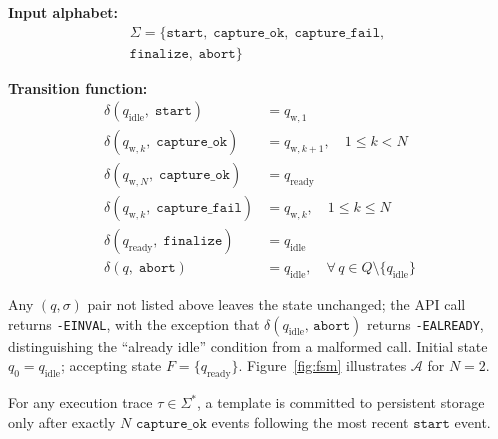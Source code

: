 \noindent\textbf{Input alphabet:}
\begin{multline}
  \Sigma = \{\mathtt{start},\;
             \mathtt{capture\_ok},\;
             \mathtt{capture\_fail},\; \\
             \mathtt{finalize},\;
             \mathtt{abort}\}
  \label{eq:alphabet}
\end{multline}

\noindent\textbf{Transition function:}
\begin{align}
  \delta(q_{\mathrm{idle}},\; \mathtt{start})
    &= q_{\mathrm{w},1}
    \label{eq:d_start}\\
  \delta(q_{\mathrm{w},k},\; \mathtt{capture\_ok})
    &= q_{\mathrm{w},k+1},
    \quad 1 \le k < N
    \label{eq:d_ok}\\
  \delta(q_{\mathrm{w},N},\; \mathtt{capture\_ok})
    &= q_{\mathrm{ready}}
    \label{eq:d_final}\\
  \delta(q_{\mathrm{w},k},\; \mathtt{capture\_fail})
    &= q_{\mathrm{w},k},
    \quad 1 \le k \le N
    \label{eq:d_fail}\\
  \delta(q_{\mathrm{ready}},\; \mathtt{finalize})
    &= q_{\mathrm{idle}}
    \label{eq:d_finalize}\\
  \delta(q,\; \mathtt{abort})
    &= q_{\mathrm{idle}},
    \quad \forall\, q \in Q \setminus \{q_{\mathrm{idle}}\}
    \label{eq:d_abort}
\end{align}

Any $(q, \sigma)$ pair not listed above leaves the state unchanged; the API call returns \texttt{-EINVAL}, with the exception that $\delta(q_{\mathrm{idle}},\,\mathtt{abort})$ returns \texttt{-EALREADY}, distinguishing the ``already idle'' condition from a malformed call. Initial state $q_0 = q_{\mathrm{idle}}$; accepting state $F = \{q_{\mathrm{ready}}\}$. Figure~\ref{fig:fsm} illustrates $\mathcal{A}$ for $N = 2$.

\begin{proposition}
\label{prop:safety}
For any execution trace $\tau \in \Sigma^*$, a template is committed to persistent storage only after exactly $N$ $\mathtt{capture\_ok}$ events following the most recent $\mathtt{start}$ event.
\end{proposition}

